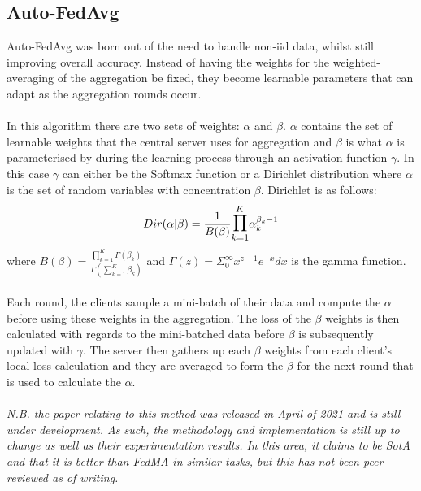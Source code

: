 \subsection{Auto-FedAvg}
Auto-FedAvg \cite{autofa} was born out of the need to handle non-iid data, whilst still improving overall accuracy.
Instead of having the weights for the weighted-averaging of the aggregation be fixed, they become learnable parameters that can adapt as the aggregation rounds occur.
\\ \\
In this algorithm there are two sets of weights: $\alpha$ and $\beta$.
$\alpha$ contains the set of learnable weights that the central server uses for aggregation and $\beta$ is what $\alpha$ is parameterised by during the learning process through an activation function $\gamma$.
In this case $\gamma$ can either be the Softmax function or a Dirichlet distribution where $\alpha$ is the set of random variables with concentration $\beta$. 
Dirichlet is as follows:
\begin{equation}
    Dir(\alpha | \beta) = \dfrac{1}{B(\beta)} \mathlarger{\mathlarger{\prod}}_{k=1}^{K} \alpha_k^{\beta_k-1}
\end{equation}
where $B(\beta) = \frac{\prod_{k=1}^K \Gamma(\beta_k)}{\Gamma (\sum_{k=1}^K \beta_k)}$ and $\Gamma(z) = \Sigma_0^\infty x^{z-1} e^{-x} dx$ is the gamma function.
\\ \\
Each round, the clients sample a mini-batch of their data and compute the $\alpha$ before using these weights in the aggregation.
The loss of the $\beta$ weights is then calculated with regards to the mini-batched data before $\beta$ is subsequently updated with $\gamma$.
The server then gathers up each $\beta$ weights from each client's local loss calculation and they are averaged to form the $\beta$ for the next round that is used to calculate the $\alpha$.
\\ \\
\textit{N.B. the paper relating to this method \cite{autofa} was released in April of 2021 and is still under development. As such, the methodology and implementation is still up to change as well as their experimentation results. In this area, it claims to be SotA and that it is better than FedMA in similar tasks, but this has not been peer-reviewed as of writing.}